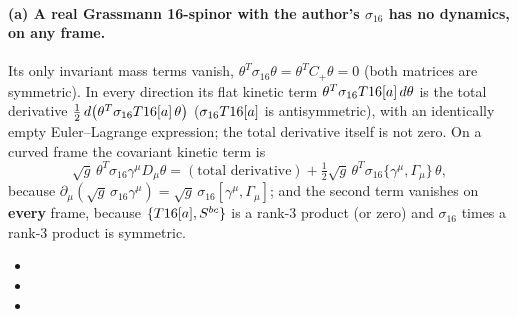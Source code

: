 \paragraph{(a) A real Grassmann 16-spinor with the author's $\sigma_{16}$ has no dynamics, on any
frame.} Its only invariant mass terms vanish, $\theta^{T}\sigma_{16}\theta=\theta^{T}C_+\theta=0$
(both matrices are symmetric). In every direction its flat kinetic term
$\theta^{T}\sigma_{16}T16[a]\,d\theta$ is the total derivative
$\tfrac12\,d\bigl(\theta^{T}\sigma_{16}T16[a]\,\theta\bigr)$ ($\sigma_{16}T16[a]$ is
antisymmetric), with an identically empty Euler--Lagrange expression; the total derivative itself is
not zero. On a curved frame the covariant kinetic term is
\[
  \sqrt g\,\theta^{T}\sigma_{16}\gamma^\mu D_\mu\theta=(\text{total derivative})
  +\tfrac12\sqrt g\,\theta^{T}\sigma_{16}\{\gamma^\mu,\Gamma_\mu\}\,\theta ,
\]
because $\partial_\mu(\sqrt g\,\sigma_{16}\gamma^\mu)=\sqrt g\,\sigma_{16}[\gamma^\mu,\Gamma_\mu]$;
and the second term vanishes on \textbf{every} frame, because $\{T16[a],S^{bc}\}$ is a rank-3
product (or zero) and $\sigma_{16}$ times a rank-3 product is symmetric. 
\begin{itemize}
  \item {}
  \item {}
  \item {}
\end{itemize}

